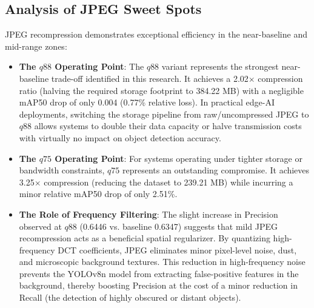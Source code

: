 \documentclass[12pt, a4paper]{article}
\begin{document}
\subsection{Analysis of JPEG Sweet Spots}
JPEG recompression demonstrates exceptional efficiency in the near-baseline and mid-range zones:
\begin{itemize}
    \item \textbf{The $q88$ Operating Point}: The $q88$ variant represents the strongest near-baseline trade-off identified in this research. It achieves a 2.02$\times$ compression ratio (halving the required storage footprint to 384.22 MB) with a negligible mAP50 drop of only 0.004 (0.77\% relative loss). In practical edge-AI deployments, switching the storage pipeline from raw/uncompressed JPEG to $q88$ allows systems to double their data capacity or halve transmission costs with virtually no impact on object detection accuracy.
    \item \textbf{The $q75$ Operating Point}: For systems operating under tighter storage or bandwidth constraints, $q75$ represents an outstanding compromise. It achieves 3.25$\times$ compression (reducing the dataset to 239.21 MB) while incurring a minor relative mAP50 drop of only 2.51\%.
    \item \textbf{The Role of Frequency Filtering}: The slight increase in Precision observed at $q88$ (0.6446 vs. baseline 0.6347) suggests that mild JPEG recompression acts as a beneficial spatial regularizer. By quantizing high-frequency DCT coefficients, JPEG eliminates minor pixel-level noise, dust, and microscopic background textures. This reduction in high-frequency noise prevents the YOLOv8n model from extracting false-positive features in the background, thereby boosting Precision at the cost of a minor reduction in Recall (the detection of highly obscured or distant objects).
\end{itemize}
\end{document}
